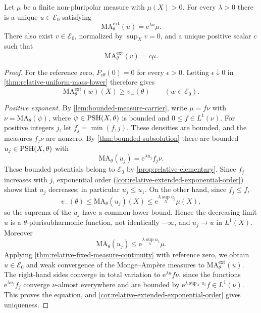 \begin{theorem}\label{thm:general-measure-minimal}
Let $\mu$ be a finite non-pluripolar measure with $\mu(X)>0$.
For every $\lambda>0$ there is a unique $u\in\mathcal E_0$ satisfying
\[
 \mathrm{MA}_\theta^{\mathrm{ext}}(u)=\mathrm{e}^{\lambda u}\mu.
\]
There also exist $v\in\mathcal E_0$, normalized by $\sup_Xv=0$, and a unique positive scalar $c$ such that
\[
 \mathrm{MA}_\theta^{\mathrm{ext}}(v)=c\mu.
\]
\end{theorem}
\begin{proof}
For the reference zero, $P_{\epsilon\theta}(0)=0$ for every $\epsilon>0$. Letting $\epsilon\downarrow0$ in \cref{thm:relative-uniform-mass-lower} therefore gives
\begin{equation}\label{eq:minimal-lower-mass}
 \mathrm{MA}^{\mathrm{ext}}_\theta(w)(X)\geq v_-(\theta)
 \qquad(w\in\mathcal E_0).
\end{equation}

\emph{Positive exponent.} By \cref{lem:bounded-measure-carrier}, write $\mu=f\nu$ with $\nu=\mathrm{MA}_\theta(\psi)$, where $\psi\in\mathrm{PSH}(X,\theta)$ is bounded and $0\leq f\in L^1(\nu)$. For positive integers $j$, let $f_j=\min(f,j)$. These densities are bounded, and the measures $f_j\nu$ are nonzero. By \cref{thm:bounded-subsolution} there are bounded $u_j\in\mathrm{PSH}(X,\theta)$ with
\[
 \mathrm{MA}_\theta(u_j)=\mathrm{e}^{\lambda u_j}f_j\nu.
\]
These bounded potentials belong to $\mathcal E_0$ by \cref{prop:relative-elementary}. Since $f_j$ increases with $j$, exponential order (\cref{cor:relative-extended-exponential-order}) shows that $u_j$ decreases; in particular $u_j\leq u_1$. On the other hand, since $f_j\leq f$,
\[
 v_-(\theta)\leq\mathrm{MA}_\theta(u_j)(X)
       \leq \mathrm{e}^{\lambda\sup_Xu_j}\mu(X),
\]
so the suprema of the $u_j$ have a common lower bound. Hence the decreasing limit $u$ is a $\theta$-plurisubharmonic function, not identically $-\infty$, and $u_j\to u$ in $L^1(X)$. Moreover
\[
 \mathrm{MA}_\theta(u_j)\leq \mathrm{e}^{\lambda\sup_Xu_1}\mu.
\]
Applying \cref{thm:relative-fixed-measure-continuity} with reference zero, we obtain $u\in\mathcal E_0$ and weak convergence of the Monge--Amp\`ere measures to $\mathrm{MA}^{\mathrm{ext}}_\theta(u)$. The right-hand sides converge in total variation to $\mathrm{e}^{\lambda u}f\nu$, since the functions $\mathrm{e}^{\lambda u_j}f_j$ converge $\nu$-almost everywhere and are bounded by $\mathrm{e}^{\lambda\sup_Xu_1}f\in L^1(\nu)$. This proves the equation, and \cref{cor:relative-extended-exponential-order} gives uniqueness.


\end{proof}
